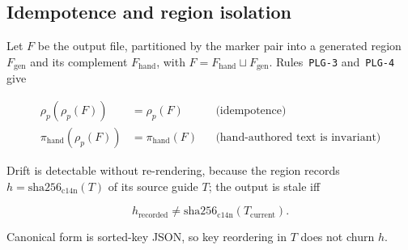 \documentclass[11pt]{article}
\begin{document}
\subsection{Idempotence and region isolation}

Let $F$ be the output file, partitioned by the marker pair into a generated region
$F_{\mathrm{gen}}$ and its complement $F_{\mathrm{hand}}$, with $F = F_{\mathrm{hand}} \sqcup F_{\mathrm{gen}}$.
Rules~\texttt{PLG-3} and~\texttt{PLG-4} give

\begin{align}
  \rho_p\!\left(\rho_p(F)\right) &= \rho_p(F)
    &&\text{(idempotence)} \label{lbl:idem}\\
  \pi_{\mathrm{hand}}\!\left(\rho_p(F)\right) &= \pi_{\mathrm{hand}}(F)
    &&\text{(hand-authored text is invariant)} \label{lbl:iso}
\end{align}

Drift is detectable without re-rendering, because the region records
$h = \mathrm{sha256}_{\mathrm{c14n}}(T)$ of its source guide $T$; the output is stale iff

\begin{equation}
  h_{\text{recorded}} \neq \mathrm{sha256}_{\mathrm{c14n}}(T_{\text{current}}).
  \label{lbl:drift}
\end{equation}

Canonical form is sorted-key JSON, so key reordering in $T$ does not churn $h$.
\end{document}
